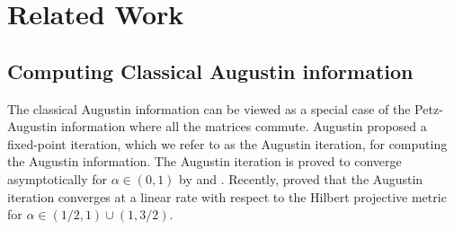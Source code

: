 \documentclass{article}
\begin{document}
 


\section{Related Work}
\label{sec:related_work}
\subsection{Computing Classical Augustin information}
The classical Augustin information \cite{Augustin1978,Csiszar1995} can be viewed as a special case of the Petz-Augustin information 
where all the matrices commute. 
Augustin \cite{Augustin1978} proposed a fixed-point iteration, which we 
refer to as the Augustin iteration, for computing the Augustin information. 
The Augustin iteration
is proved to converge asymptotically for $\alpha\in(0,1)$ by 
\citet{Karakos2008} and 
\citet{Nakiboglu2019}. 
Recently, \citet{Tsai2024} proved that the Augustin iteration converges 
at a linear rate
with respect to the Hilbert projective metric for $\alpha\in(1/2,1)\cup(1,3/2)$.
\end{document}
